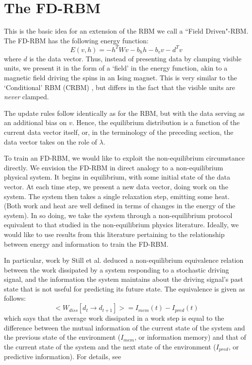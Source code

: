 \documentclass[11pt, oneside]{article}   	%
\begin{document}
\section{The FD-RBM}

This is the basic idea for an extension of the RBM we call a ``Field Driven"-RBM.  The FD-RBM has the following energy function: 
$$E(v,h) = - h^T W v - b_h h - b_v v - d^T v$$
where $d$ is the data vector.  Thus, instead of presenting data by clamping visible units, we present it in the form of a `field' in the energy function, akin to a magnetic field driving the spins in an Ising magnet.   This is very similar to the `Conditional' RBM (CRBM) \cite{CRBM}, but differs in the fact that the visible units are \emph{never} clamped.

The update rules follow identically as for the RBM, but with the data serving as an additional bias on $v$.  Hence, the equilibrium distribution is a function of the current data vector itself, or, in the terminology of the preceding section, the data vector takes on the role of $\lambda$.

To train an FD-RBM, we would like to exploit the non-equilibrium circumstance directly.  We envision the FD-RBM in direct analogy to a non-equilibrium physical system.  It begins in equilibrium, with some initial state of the data vector.  At each time step, we present a new data vector, doing work on the system.  The system then takes a single relaxation step, emitting some heat.  (Both work and heat are well defined in terms of changes in the energy of the system).  In so doing, we take the system through a non-equilibrium protocol equivalent to that studied in the non-equilibrium physics literature.  Ideally, we would like to use results from this literature pertaining to the relationship between energy and information to train the FD-RBM.

In particular, work by Still et al. \cite{ToP} deduced a non-equilibrium equivalence relation between the work dissipated by a system responding to a stochastic driving signal, and the information the system maintains about the driving signal's past state that is not useful for predicting its future state.  The equivalence is given as follows:
$$ <W_{diss}[d_t \to d_{t+1}]> = I_{mem}(t) - I_{pred}(t) $$
which says that the average work dissipated in a work step is equal to the difference between the mutual information of the current state of the system and the previous state of the environment ($I_{mem}$, or information memory) and that of the current state of the system and the next state of the environment ($I_{pred}$, or predictive information).  For details, see \cite{ToP} 
\end{document}
